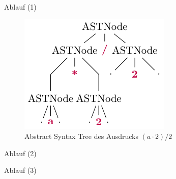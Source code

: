 \begin{frame}{Ablauf (1)}
    \begin{figure}[H]
        \centering
        \includegraphics[scale=1.4]{utils/ast.pdf}
        \caption{Abstract Syntax Tree des Ausdrucks $(a \cdot 2) / 2$}
        \label{fig:komponenten}
    \end{figure}
\end{frame}

\begin{frame}{Ablauf (2)}
    
\end{frame}

\begin{frame}{Ablauf (3)}
    
\end{frame}